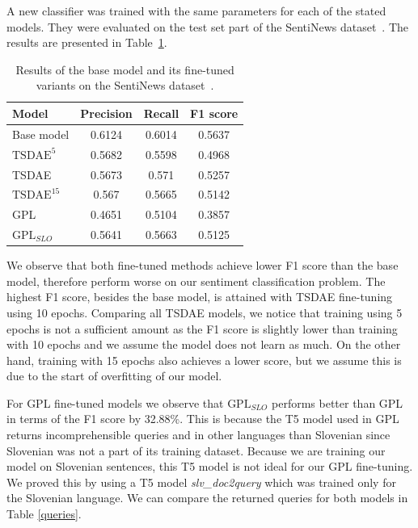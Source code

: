 \documentclass[fleqn,moreauthors,10pt]{ds_report}
\begin{document}
A new classifier was trained with the same parameters for each of the stated models. They were evaluated on the test set part of the SentiNews dataset~\cite{sentiNews}. The results are presented in Table~\ref{tab2}.

\begin{table}[!h]
	\footnotesize
	\begin{center}
		\begin{tabular}{ |l|c|c|c| }
		\hline
		\rowcolor{Blue}Model & Precision & Recall & F1 score\\
		\hline

		Base model & 0.6124 & 0.6014 & 0.5637\\
		\hline
		$\text{TSDAE}^{5}$ & 0.5682 & 0.5598 & 0.4968\\
		TSDAE &  0.5673 & 0.571 & 0.5257\\
		$\text{TSDAE}^{15}$ & 0.567 & 0.5665 & 0.5142\\
		\hline
		GPL & 0.4651 & 0.5104 & 0.3857\\
		$\text{GPL}_{SLO}$ & 0.5641 & 0.5663 & 0.5125\\

		\hline
		\end{tabular}
	\end{center}
\caption{Results of the base model and its fine-tuned variants on the SentiNews dataset~\cite{sentiNews}.}
\label{tab2}
\end{table}


We observe that both fine-tuned methods achieve lower F1 score than the base model, therefore perform worse on our sentiment classification problem. The highest F1 score, besides the base model, is attained with TSDAE fine-tuning using 10 epochs. Comparing all TSDAE models, we notice that training using 5 epochs is not a sufficient amount as the F1 score is slightly lower than training with 10 epochs and we assume the model does not learn as much. On the other hand, training with 15 epochs also achieves a lower score, but we assume this is due to the start of overfitting of our model.

For GPL fine-tuned models we observe that $\text{GPL}_{SLO}$ performs better than GPL in terms of the F1 score by 32.88\%. This is because the T5 model used in GPL returns incomprehensible queries and in other languages than Slovenian
since Slovenian was not a part of its training dataset. Because we are training our model on Slovenian sentences, this T5 model is not ideal for our GPL fine-tuning. We
proved this by using a T5 model {\it slv\_doc2query} which was trained only for the Slovenian language. We can compare the returned queries for both models in Table \ref*{queries}.
\end{document}
